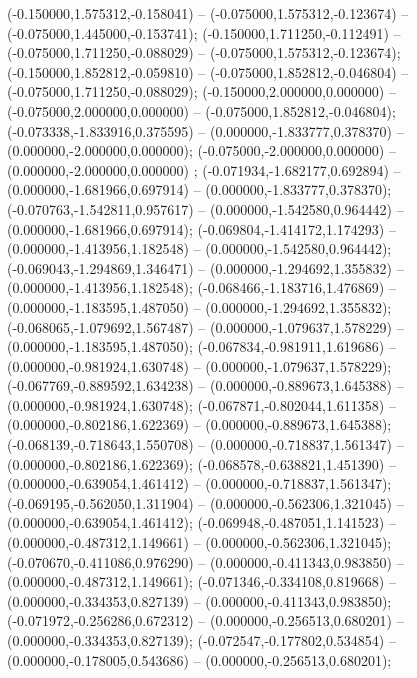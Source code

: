  (-0.150000,1.575312,-0.158041) -- (-0.075000,1.575312,-0.123674) -- (-0.075000,1.445000,-0.153741);
 (-0.150000,1.711250,-0.112491) -- (-0.075000,1.711250,-0.088029) -- (-0.075000,1.575312,-0.123674);
 (-0.150000,1.852812,-0.059810) -- (-0.075000,1.852812,-0.046804) -- (-0.075000,1.711250,-0.088029);
 (-0.150000,2.000000,0.000000) -- (-0.075000,2.000000,0.000000) -- (-0.075000,1.852812,-0.046804);
 (-0.073338,-1.833916,0.375595) -- (0.000000,-1.833777,0.378370) -- (0.000000,-2.000000,0.000000);
 (-0.075000,-2.000000,0.000000) -- (0.000000,-2.000000,0.000000) ;
 (-0.071934,-1.682177,0.692894) -- (0.000000,-1.681966,0.697914) -- (0.000000,-1.833777,0.378370);
 (-0.070763,-1.542811,0.957617) -- (0.000000,-1.542580,0.964442) -- (0.000000,-1.681966,0.697914);
 (-0.069804,-1.414172,1.174293) -- (0.000000,-1.413956,1.182548) -- (0.000000,-1.542580,0.964442);
 (-0.069043,-1.294869,1.346471) -- (0.000000,-1.294692,1.355832) -- (0.000000,-1.413956,1.182548);
 (-0.068466,-1.183716,1.476869) -- (0.000000,-1.183595,1.487050) -- (0.000000,-1.294692,1.355832);
 (-0.068065,-1.079692,1.567487) -- (0.000000,-1.079637,1.578229) -- (0.000000,-1.183595,1.487050);
 (-0.067834,-0.981911,1.619686) -- (0.000000,-0.981924,1.630748) -- (0.000000,-1.079637,1.578229);
 (-0.067769,-0.889592,1.634238) -- (0.000000,-0.889673,1.645388) -- (0.000000,-0.981924,1.630748);
 (-0.067871,-0.802044,1.611358) -- (0.000000,-0.802186,1.622369) -- (0.000000,-0.889673,1.645388);
 (-0.068139,-0.718643,1.550708) -- (0.000000,-0.718837,1.561347) -- (0.000000,-0.802186,1.622369);
 (-0.068578,-0.638821,1.451390) -- (0.000000,-0.639054,1.461412) -- (0.000000,-0.718837,1.561347);
 (-0.069195,-0.562050,1.311904) -- (0.000000,-0.562306,1.321045) -- (0.000000,-0.639054,1.461412);
 (-0.069948,-0.487051,1.141523) -- (0.000000,-0.487312,1.149661) -- (0.000000,-0.562306,1.321045);
 (-0.070670,-0.411086,0.976290) -- (0.000000,-0.411343,0.983850) -- (0.000000,-0.487312,1.149661);
 (-0.071346,-0.334108,0.819668) -- (0.000000,-0.334353,0.827139) -- (0.000000,-0.411343,0.983850);
 (-0.071972,-0.256286,0.672312) -- (0.000000,-0.256513,0.680201) -- (0.000000,-0.334353,0.827139);
 (-0.072547,-0.177802,0.534854) -- (0.000000,-0.178005,0.543686) -- (0.000000,-0.256513,0.680201);
